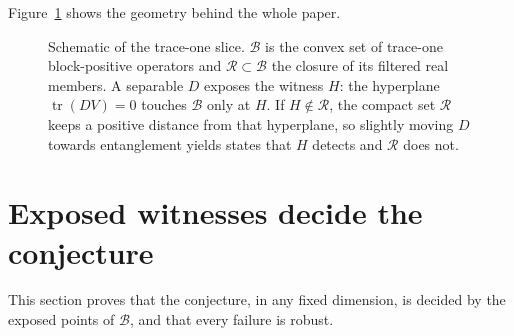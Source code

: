 \documentclass[11pt,a4paper]{article}
\theoremstyle{definition}\newtheorem{definition}[theorem]{Definition}\newtheorem*{conj}{Conjecture 9 of Shen, Chen and Bian}\newtheorem{remark}[theorem]{Remark}
\newcommand{\tr}{\operatorname{tr}}\newcommand{\im}{\operatorname{Im}}\newcommand{\adj}{\operatorname{adj}}\newcommand{\id}{\mathbb I}
\newcommand{\cB}{\mathcal B}\newcommand{\cR}{\mathcal R}\newcommand{\vecm}{\mathrm{vec}}
\begin{document}
Figure~\ref{fig:cone} shows the geometry behind the whole paper.
\begin{figure}[t]
\centering
{}
\caption{Schematic of the trace-one slice. $\cB$ is the convex set of trace-one block-positive operators and $\cR\subset\cB$ the closure of its filtered real members. A separable $D$ exposes the witness $H$: the hyperplane $\tr(DV)=0$ touches $\cB$ only at $H$. If $H\notin\cR$, the compact set $\cR$ keeps a positive distance from that hyperplane, so slightly moving $D$ towards entanglement yields states that $H$ detects and $\cR$ does not.}\label{fig:cone}
\end{figure}

\section{Exposed witnesses decide the conjecture}\label{sec:dichotomy}
This section proves that the conjecture, in any fixed dimension, is decided by the exposed points of $\cB$, and that every failure is robust.
\end{document}
